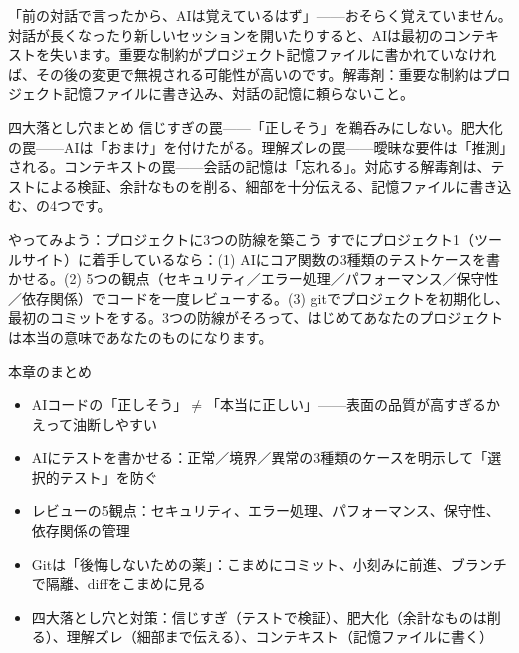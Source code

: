 
「前の対話で言ったから、AIは覚えているはず」——おそらく覚えていません。対話が長くなったり新しいセッションを開いたりすると、AIは最初のコンテキストを失います。重要な制約がプロジェクト記憶ファイルに書かれていなければ、その後の変更で無視される可能性が高いのです。解毒剤：重要な制約はプロジェクト記憶ファイルに書き込み、対話の記憶に頼らないこと。

\begin{tcbwarn}{四大落とし穴まとめ}
信じすぎの罠——「正しそう」を鵜呑みにしない。肥大化の罠——AIは「おまけ」を付けたがる。理解ズレの罠——曖昧な要件は「推測」される。コンテキストの罠——会話の記憶は「忘れる」。対応する解毒剤は、テストによる検証、余計なものを削る、細部を十分伝える、記憶ファイルに書き込む、の4つです。

\end{tcbwarn}

\begin{tcbpractice}{やってみよう：プロジェクトに3つの防線を築こう}
すでにプロジェクト1（ツールサイト）に着手しているなら：(1) AIにコア関数の3種類のテストケースを書かせる。(2) 5つの観点（セキュリティ／エラー処理／パフォーマンス／保守性／依存関係）でコードを一度レビューする。(3) gitでプロジェクトを初期化し、最初のコミットをする。3つの防線がそろって、はじめてあなたのプロジェクトは本当の意味であなたのものになります。

\end{tcbpractice}

\begin{tcbsummary}{本章のまとめ}
\begin{itemize}
  \item AIコードの「正しそう」$\neq$「本当に正しい」——表面の品質が高すぎるかえって油断しやすい
  \item AIにテストを書かせる：正常／境界／異常の3種類のケースを明示して「選択的テスト」を防ぐ
  \item レビューの5観点：セキュリティ、エラー処理、パフォーマンス、保守性、依存関係の管理
  \item Gitは「後悔しないための薬」：こまめにコミット、小刻みに前進、ブランチで隔離、diffをこまめに見る
  \item 四大落とし穴と対策：信じすぎ（テストで検証）、肥大化（余計なものは削る）、理解ズレ（細部まで伝える）、コンテキスト（記憶ファイルに書く）
\end{itemize}

\end{tcbsummary}
